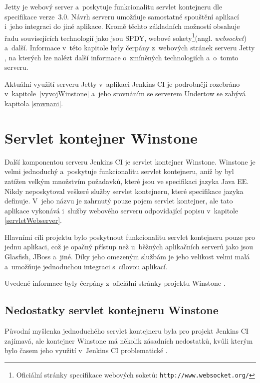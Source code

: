         Jetty je webový server a~poskytuje funkcionalitu servlet kontejneru dle specifikace verze~3.0. 
        Návrh serveru umožňuje samostatné spouštění aplikací i~jeho integraci do jiné aplikace. 
        Kromě těchto základních možností obsahuje
        řadu souvisejících technologií jako jsou SPDY, webové sokety\footnote{Oficiální stránky 
            specifikace webových soketů: \texttt{http://www.websocket.org/}}(angl. \emph{websocket}) a~další. 
        Informace v~této kapitole byly čerpány z~webových stránek serveru Jetty \cite{jettyWeb}, na kterých lze nalézt 
        další informace o~zmíněných technologiích a~o~tomto serveru.
        
        Aktuální využití serveru Jetty v~aplikaci Jenkins CI je podrobněji rozebráno
        v~kapitole~\ref{vyvojWinstone} a~jeho srovnáním se serverem Undertow se 
        zabývá kapitola \ref{srovnani}.
        

    \section{Servlet kontejner Winstone} \label{winstone}
        Další komponentou serveru Jenkins CI je servlet kontejner Winstone.
        Winstone je velmi jednoduchý a~poskytuje funkcionalitu
        servlet kontejneru, aniž by byl zatížen velkým množstvím požadavků, které jsou ve specifikaci jazyka Java EE.
        Nikdy neposkytoval veškeré služby servlet kontejneru, které specifikace jazyka definuje. 
        V~jeho názvu je zahrnutý pouze pojem servlet kontejner, ale tato aplikace vykonává i~služby
        webového serveru odpovídající popisu v~kapitole \ref{servletWebserver}.

        Hlavními cíli projektu bylo poskytnout funkcionalitu servlet kontejneru pouze pro jednu aplikaci,
        což je opačný přístup než u~běžných aplikačních serverů jako jsou Glasfish, JBoss a~jiné.
        Díky jeho omezeným službám je jeho velikost velmi malá a~umožňuje jednoduchou integraci
        s~cílovou aplikací.

        Uvedené informace byly čerpány z~oficiální stránky projektu Winstone \cite{winstoneWeb}.

        \subsection{Nedostatky servlet kontejneru Winstone}
            Původní myšlenka jednoduchého servlet kontejneru byla pro projekt Jenkins CI zajímavá, ale
            kontejner Winstone má několik zásadních nedostatků, kvůli kterým bylo časem jeho využití
            v~Jenkins CI problematické \cite{kohsukeTopic}. 

